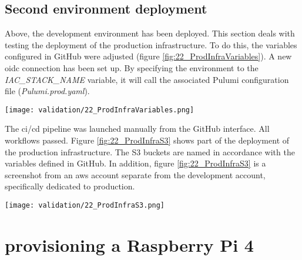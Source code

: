 \subsection{Second environment deployment}
Above, the development environment has been deployed. This section deals with testing the deployment of the production infrastructure. To do this, the variables configured in GitHub were adjusted (figure \ref{fig:22_ProdInfraVariables}). A new \acrshort{oidc} connection has been set up. By specifying the environment to the \textit{IAC\_STACK\_NAME} variable, it will call the associated Pulumi configuration file (\textit{Pulumi.prod.yaml}).
\begin{center}
    \begingroup
    \texttt{[image: validation/22\_ProdInfraVariables.png]}
    \label{fig:22_ProdInfraVariables}
    \endgroup
\end{center}
The \acrshort{ci}/\acrshort{cd} pipeline was launched manually from the GitHub interface. All workflows passed. Figure \ref{fig:22_ProdInfraS3} shows part of the deployment of the production infrastructure. The S3 buckets are named in accordance with the variables defined in GitHub. In addition, figure \ref{fig:22_ProdInfraS3} is a screenshot from an \gls{aws} account separate from the development account, specifically dedicated to production.
\begin{center}
    \begingroup
    \texttt{[image: validation/22\_ProdInfraS3.png]}
    \label{fig:22_ProdInfraS3}
    \endgroup
\end{center}

\section{\texorpdfstring{\Gls{provisioning}}{} a Raspberry Pi 4}

